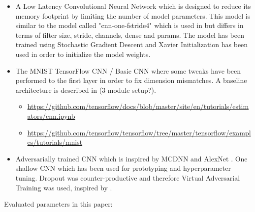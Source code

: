 \documentclass{article}
\theoremstyle{definition}
\theoremstyle{remark}
\begin{document}
\begin{itemize}
	\item A Low Latency Convolutional Neural Network which is designed to reduce its memory footprint by limiting the number of model parameters. This model is similar to the model called "cnn-one-fstride4" which is used in \cite{sainath2015convolutional} but differs in terms of filter size, stride, channels, dense and params. The model has been trained using Stochastic Gradient Descent and Xavier Initialization has been used in order to initialize the model weights.
	\item The MNIST TensorFlow CNN / Basic CNN where some tweaks have been performed to the first layer in order to fix dimension mismatches. A baseline architecture is described in \cite{sainath2015convolutional} (3 module setup?).
	
		\begin{itemize}
			\item \url{https://github.com/tensorflow/docs/blob/master/site/en/tutorials/estimators/cnn.ipynb}
			\item \url{https://github.com/tensorflow/tensorflow/tree/master/tensorflow/examples/tutorials/mnist}
		\end{itemize}
		
		\item Adversarially trained CNN which is inspired by MCDNN \cite{cirecsan2012multi} and AlexNet \cite{krizhevsky2012imagenet}. One shallow CNN which has been used for prototyping and hyperparameter tuning. Dropout was counter-productive and therefore Virtual Adversarial Training was used, inspired by \cite{goodfellow2016deep}.
		
\end{itemize}

Evaluated parameters in this paper:
\end{document}
